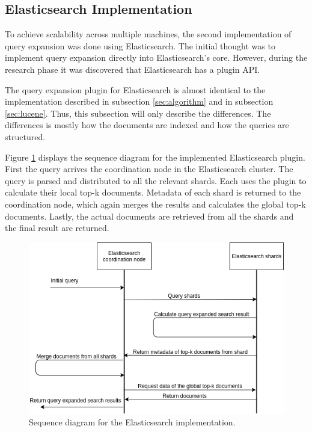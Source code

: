 \subsection{Elasticsearch Implementation}
To achieve scalability across multiple machines,
the second implementation of query expansion was done using Elasticsearch.
The initial thought was to implement query expansion directly into Elasticsearch's core.
However, during the research phase it was discovered that Elasticsearch has a plugin API.

The query expansion plugin for Elasticsearch is almost identical to the implementation described in subsection \ref{sec:algorithm} and in subsection \ref{sec:lucene}.
Thus, this subsection will only describe the differences.
The differences is mostly how the documents are indexed and how the queries are structured.

Figure \ref{fig:sequence-diagram-elasticsearch} displays the sequence diagram for the implemented Elasticsearch plugin.
First the query arrives the coordination node in the Elasticsearch cluster.
The query is parsed and distributed to all the relevant shards.
Each uses the plugin to calculate their local top-k documents.
Metadata of each shard is returned to the coordination node,
which again merges the results and calculates the global top-k documents.
Lastly,
the actual documents are retrieved from all the shards and the final result are returned.

\begin{figure}[h!]
  \centering \includegraphics[width=1\linewidth]{img/sequence-diagram-elasticsearch.png}
  \caption{Sequence diagram for the Elasticsearch implementation.}
  \label{fig:sequence-diagram-elasticsearch}
\end{figure}

